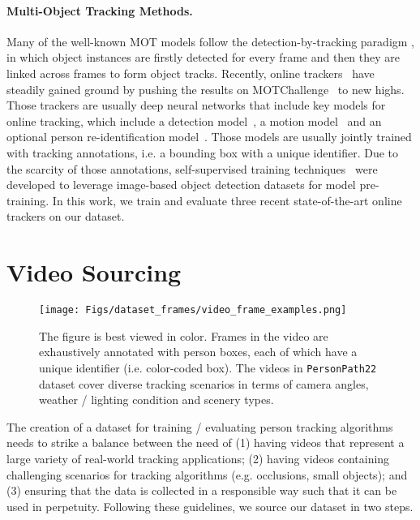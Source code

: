 \documentclass[runningheads]{llncs}
\begin{document}
\paragraph{\textbf{Multi-Object Tracking Methods.}} Many of the well-known MOT models follow the detection-by-tracking paradigm \cite{siammot,sort,sort2,leal2016learning,ristani2018features,wang2019exploit,xu2019spatial,xu2020train}, in which object instances are firstly detected for every frame and then they are linked across frames to form object tracks. 
Recently, online trackers~\cite{siammot,centernet,fairmot,quasidense,jde} have steadily gained ground by pushing the results on MOTChallenge~\cite{mot} to new highs. Those trackers are usually deep neural networks that include key models for online tracking, which include a detection model~\cite{centernet,fasterrcnn,fcos,detr}, a motion model~\cite{sort,sort2,siammot,siamfc,siamrpn++} and an optional person re-identification model~\cite{jde,fairmot}. Those models are usually jointly trained with tracking annotations, i.e. a bounding box with a unique identifier. Due to the scarcity of those annotations, self-supervised training techniques~\cite{centertrack,siammot,fairmot,pointid} were developed to leverage image-based object detection datasets for model pre-training. 
In this work, we train and evaluate three recent state-of-the-art online trackers on our dataset. 





%
 



\section{Video Sourcing}\label{sec:sourcing}

\begin{figure}[t]
    \centering
    \texttt{[image: Figs/dataset\_frames/video\_frame\_examples.png]}
\caption{ \small The figure is best viewed in color.  Frames in the video are exhaustively annotated with person boxes, each of which have a unique identifier (i.e. color-coded box).  The videos in \texttt{PersonPath22} dataset cover diverse tracking scenarios in terms of  camera angles, weather / lighting condition and scenery types. 
    }
    \label{fig:video_frames}
\end{figure}

The creation of a dataset for training / evaluating person tracking algorithms needs to strike a balance between the need of (1) having videos that represent a large variety of real-world tracking applications; (2) having videos containing challenging scenarios for tracking algorithms (e.g. occlusions, small objects);
and 
(3) ensuring that the data is collected in a responsible way such that it can be used in perpetuity.
Following these guidelines, we source our dataset in two steps.
\end{document}
